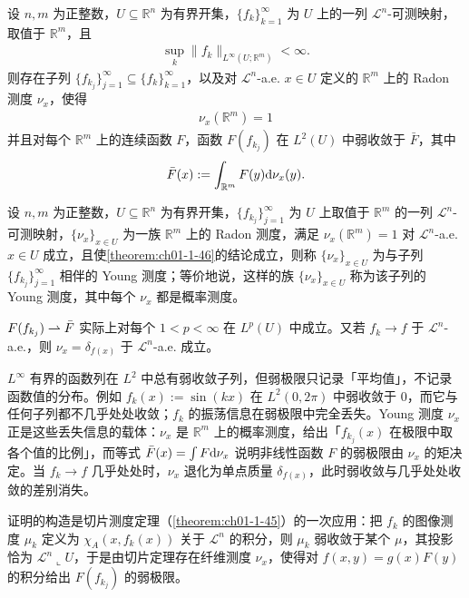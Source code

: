 \documentclass[../../main.tex]{subfiles}%
\begin{document}
\begin{theorem}\label{theorem:ch01-1-46}
设 $n,m$ 为正整数，$U\subseteq\mathbb{R}^n$ 为有界开集，$\{f_k\}_{k=1}^{\infty}$ 为 $U$ 上的一列 $\mathcal{L}^n$-可测映射，取值于 $\mathbb{R}^m$，且
\begin{align*}
\sup_k\lVert f_k\rVert_{L^\infty(U;\mathbb{R}^m)}<\infty .
\end{align*}
则存在子列 $\{f_{k_j}\}_{j=1}^{\infty}\subseteq\{f_k\}_{k=1}^{\infty}$，以及对 $\mathcal{L}^n$-a.e. $x\in U$ 定义的 $\mathbb{R}^m$ 上的 Radon 测度 $\nu_x$，使得
\begin{align*}
\nu_x(\mathbb{R}^m)=1
\end{align*}
并且对每个 $\mathbb{R}^m$ 上的连续函数 $F$，函数 $F(f_{k_j})$ 在 $L^2(U)$ 中弱收敛于 $\bar F$，其中
\begin{align*}
\bar F(x):=\int_{\mathbb{R}^m}F(y)\mathrm{d}\nu_x(y).
\end{align*}
\end{theorem}

\begin{definition}[Young 测度]\label{definition:ch01-1-34}
设 $n,m$ 为正整数，$U\subseteq\mathbb{R}^n$ 为有界开集，$\{f_{k_j}\}_{j=1}^{\infty}$ 为 $U$ 上取值于 $\mathbb{R}^m$ 的一列 $\mathcal{L}^n$-可测映射，$\{\nu_x\}_{x\in U}$ 为一族 $\mathbb{R}^m$ 上的 Radon 测度，满足 $\nu_x(\mathbb{R}^m)=1$ 对 $\mathcal{L}^n$-a.e. $x\in U$ 成立，且使\cref{theorem:ch01-1-46}的结论成立，则称 $\{\nu_x\}_{x\in U}$ 为与子列 $\{f_{k_j}\}_{j=1}^{\infty}$ 相伴的 Young 测度；等价地说，这样的族 $\{\nu_x\}_{x\in U}$ 称为该子列的 Young 测度，其中每个 $\nu_x$ 都是概率测度。%
\end{definition}

\begin{remark}\label{remark:ch01-def-1-34-补充}
$F(f_{k_j})\rightharpoonup\bar F$ 实际上对每个 $1<p<\infty$ 在 $L^p(U)$ 中成立。又若 $f_k\to f$ 于 $\mathcal{L}^n$-a.e.，则 $\nu_x=\delta_{f(x)}$ 于 $\mathcal{L}^n$-a.e. 成立。
\end{remark}

\begin{remark}\label{remark:ch01-def-1-34-动机}
$L^\infty$ 有界的函数列在 $L^2$ 中总有弱收敛子列，但弱极限只记录「平均值」，不记录函数值的分布。例如 $f_k(x):=\sin(kx)$ 在 $L^2(0,2\pi)$ 中弱收敛于 $0$，而它与任何子列都不几乎处处收敛；$f_k$ 的振荡信息在弱极限中完全丢失。Young 测度 $\nu_x$ 正是这些丢失信息的载体：$\nu_x$ 是 $\mathbb{R}^m$ 上的概率测度，给出「$f_{k_j}(x)$ 在极限中取各个值的比例」，而等式 $\bar F(x)=\int F\mathrm{d}\nu_x$ 说明非线性函数 $F$ 的弱极限由 $\nu_x$ 的矩决定。当 $f_k\to f$ 几乎处处时，$\nu_x$ 退化为单点质量 $\delta_{f(x)}$，此时弱收敛与几乎处处收敛的差别消失。

证明的构造是切片测度定理（\cref{theorem:ch01-1-45}）的一次应用：把 $f_k$ 的图像测度 $\mu_k$ 定义为 $\chi_A(x,f_k(x))$ 关于 $\mathcal{L}^n$ 的积分，则 $\mu_k$ 弱收敛于某个 $\mu$，其投影恰为 $\mathcal{L}^n\llcorner U$，于是由切片定理存在纤维测度 $\nu_x$，使得对 $f(x,y)=g(x)F(y)$ 的积分给出 $F(f_{k_j})$ 的弱极限。%
\end{remark}
\end{document}
